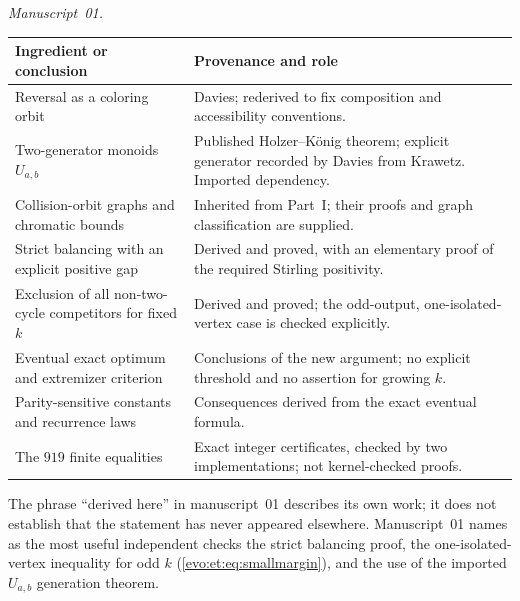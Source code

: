 \documentclass[11pt,a4paper]{article}
\numberwithin{equation}{section}
\theoremstyle{definition}
\theoremstyle{remark}
\begin{document}
\emph{Manuscript~01.}
\begin{center}
\small
\begin{tabular}{@{}>{\raggedright}p{}>{\raggedright\arraybackslash}p{}@{}}
\toprule
Ingredient or conclusion & Provenance and role\\
\midrule
Reversal as a coloring orbit & Davies; rederived to fix composition and
accessibility conventions.\\[3pt]
Two-generator monoids $U_{a,b}$ & Published Holzer--K\"onig theorem; explicit
generator recorded by Davies from Krawetz. Imported dependency.\\[3pt]
Collision-orbit graphs and chromatic bounds & Inherited from Part~I; their
proofs and graph classification are supplied.\\[3pt]
Strict balancing with an explicit positive gap & Derived and proved, with an
elementary proof of the required Stirling positivity.\\[3pt]
Exclusion of all non-two-cycle competitors for fixed $k$ & Derived and
proved; the odd-output, one-isolated-vertex case is checked explicitly.\\[3pt]
Eventual exact optimum and extremizer criterion & Conclusions of the new
argument; no explicit threshold and no assertion for growing $k$.\\[3pt]
Parity-sensitive constants and recurrence laws & Consequences derived from
the exact eventual formula.\\[3pt]
The $919$ finite equalities & Exact integer certificates, checked by two
implementations; not kernel-checked proofs.\\
\bottomrule
\end{tabular}
\end{center}
The phrase ``derived here'' in manuscript~01 describes its own work; it does
not establish that the statement has never appeared elsewhere. Manuscript~01
names as the most useful independent checks the strict balancing proof, the
one-isolated-vertex inequality for odd $k$
(\eqref{evo:et:eq:smallmargin}), and the use of the imported $U_{a,b}$
generation theorem.
\end{document}

